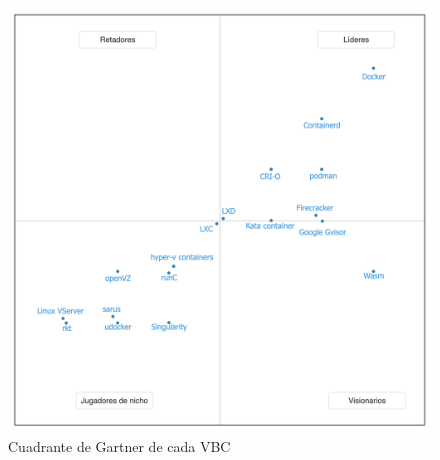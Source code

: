 \begin{figure}[H]
    \centering
    \includegraphics[scale=0.1] {tablas-images/cp3/cuadrante-gartner.png}
    \caption{Cuadrante de Gartner de cada VBC}\label{fig:tabla-cuadrante-gartner}
\end{figure}